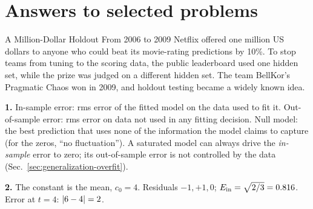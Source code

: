 \begin{problemlist}


\end{problemlist}

\section{Answers to selected problems}\label{sec:generalization-answers}
\begin{didyouknow}{A Million-Dollar Holdout}
From 2006 to 2009 Netflix offered one million US dollars to anyone who could beat its movie-rating predictions by 10\%. To stop teams from tuning to the scoring data, the public leaderboard used one hidden set, while the prize was judged on a different hidden set. The team BellKor's Pragmatic Chaos won in 2009, and holdout testing became a widely known idea.
\end{didyouknow}

\textbf{1.} In-sample error: rms error of the fitted model on the data used to fit it. Out-of-sample error: rms error on data not used in any fitting decision. Null model: the best prediction that uses none of the information the model claims to capture (for the zeros, ``no fluctuation''). A saturated model can always drive the \emph{in-sample} error to zero; its out-of-sample error is not controlled by the data (Sec.~\ref{sec:generalization-overfit}).

\textbf{2.} The constant is the mean, $c_0=4$. Residuals $-1,+1,0$; $E_{\rm in}=\sqrt{2/3}=0.816$. Error at $t=4$: $\left\lvert 6-4\right\rvert=2$.

